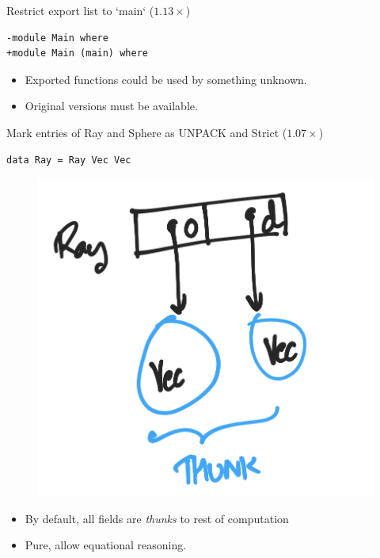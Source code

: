 \documentclass[8pt]{beamer}
\begin{document}
\begin{frame}[fragile]{Restrict export list to `main` ($1.13\times$)}
\begin{verbatim}
-module Main where
+module Main (main) where
\end{verbatim}

\pause
\begin{itemize}
\item Exported functions could be used by something unknown.
\item Original versions must be available.
\end{itemize}
\end{frame}


\begin{frame}[fragile]{Mark entries of Ray and Sphere as UNPACK and Strict ($1.07\times$)}
\begin{verbatim}
data Ray = Ray Vec Vec 
\end{verbatim}

\begin{figure}
\includegraphics[height=0.4\textheight]{./ray-thunk.png}
\end{figure}

\begin{itemize}
\item By default, all fields are \emph{thunks} to rest of computation
\item Pure, allow equational reasoning.
\end{itemize}
\end{frame}
\end{document}

